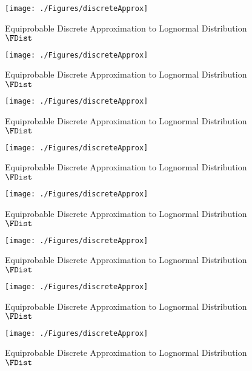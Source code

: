  \begin{figure}
    \texttt{[image: ./Figures/discreteApprox]}
    \caption{Equiprobable Discrete Approximation to Lognormal Distribution $\FDist$}
    \label{fig:discreteapprox}
  \end{figure}
  \hypertarget{discreteApprox}{}
  \begin{figure}
    \texttt{[image: ./Figures/discreteApprox]}
    \caption{Equiprobable Discrete Approximation to Lognormal Distribution $\FDist$}
    \label{fig:discreteapprox}
  \end{figure}
  \hypertarget{discreteApprox}{}
  \begin{figure}
    \texttt{[image: ./Figures/discreteApprox]}
    \caption{Equiprobable Discrete Approximation to Lognormal Distribution $\FDist$}
    \label{fig:discreteapprox}
  \end{figure}
  \hypertarget{discreteApprox}{}
  \begin{figure}
    \texttt{[image: ./Figures/discreteApprox]}
    \caption{Equiprobable Discrete Approximation to Lognormal Distribution $\FDist$}
    \label{fig:discreteapprox}
  \end{figure}
  \hypertarget{discreteApprox}{}
  \begin{figure}
    \texttt{[image: ./Figures/discreteApprox]}
    \caption{Equiprobable Discrete Approximation to Lognormal Distribution $\FDist$}
    \label{fig:discreteapprox}
  \end{figure}
  \hypertarget{discreteApprox}{}
  \begin{figure}
    \texttt{[image: ./Figures/discreteApprox]}
    \caption{Equiprobable Discrete Approximation to Lognormal Distribution $\FDist$}
    \label{fig:discreteapprox}
  \end{figure}
  \hypertarget{discreteApprox}{}
  \begin{figure}
    \texttt{[image: ./Figures/discreteApprox]}
    \caption{Equiprobable Discrete Approximation to Lognormal Distribution $\FDist$}
    \label{fig:discreteapprox}
  \end{figure}
  \hypertarget{discreteApprox}{}
  \begin{figure}
    \texttt{[image: ./Figures/discreteApprox]}
    \caption{Equiprobable Discrete Approximation to Lognormal Distribution $\FDist$}
    \label{fig:discreteapprox}
  \end{figure}
  \hypertarget{discreteApprox}{}
